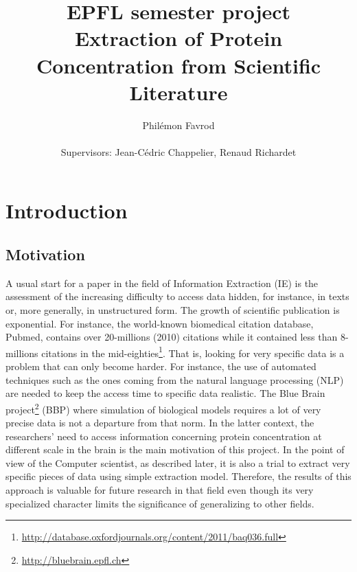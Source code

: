 \documentclass{report}
\title{EPFL semester project\\Extraction of Protein Concentration from Scientific Literature}
\author{Phil\'emon Favrod\\\\Supervisors: Jean-C\'edric Chappelier, Renaud Richardet}
\begin{document}
	\maketitle
	\tableofcontents
	\chapter{Introduction}
	

		\section{Motivation}
		\label{sec:motivations}
		A usual start for a paper in the field of Information Extraction (IE)
		is the assessment of the increasing difficulty to access data hidden, 
		for instance, in texts or, more generally, in unstructured form. The
		growth of scientific publication is exponential. For instance,
		the world-known biomedical citation database, Pubmed, contains over 		
		20-millions (2010) citations while it contained less than 8-millions
		citations in the mid-eighties\footnote{\url{http://database.oxfordjournals.org/content/2011/baq036.full}}. 
		That is, looking for very specific data is a problem that can only
		become harder. For instance, the use of automated techniques such as the ones
		coming from the natural language processing (NLP) are needed to
		keep the access time to specific data realistic. The Blue Brain 
		project\footnote{\url{http://bluebrain.epfl.ch}} (BBP)
		where simulation of biological models requires a lot of very precise
		data is not a departure from that norm. In the latter context, the
		researchers' need to access information concerning protein 
		concentration at different scale in the brain is the main motivation of this
		project. In the point of view of the Computer scientist, as described later, it
		is also a trial to extract very specific pieces of data using simple extraction
		model. Therefore, the results of this approach is valuable for future research
		in that field even though its very specialized character limits the significance
		of generalizing to other fields.
		
		
\end{document}
